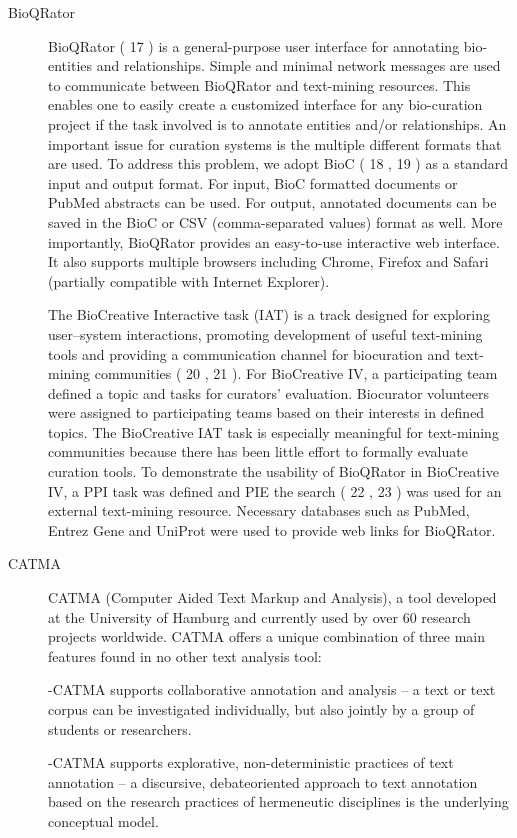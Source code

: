 \begin{description}
    \item[BioQRator]
    BioQRator ( 17 ) is a general-purpose user interface for annotating bio-entities and relationships. Simple and minimal network messages are used to communicate between BioQRator and text-mining resources. This enables one to easily create a customized interface for any bio-curation project if the task involved is to annotate entities and/or relationships. An important issue for curation systems is the multiple different formats that are used. To address this problem, we adopt BioC ( 18 , 19 ) as a standard input and output format. For input, BioC formatted documents or PubMed abstracts can be used. For output, annotated documents can be saved in the BioC or CSV (comma-separated values) format as well. More importantly, BioQRator provides an easy-to-use interactive web interface. It also supports multiple browsers including Chrome, Firefox and Safari (partially compatible with Internet Explorer).

    The BioCreative Interactive task (IAT) is a track designed for exploring user–system interactions, promoting development of useful text-mining tools and providing a communication channel for biocuration and text-mining communities ( 20 , 21 ). For BioCreative IV, a participating team defined a topic and tasks for curators’ evaluation. Biocurator volunteers were assigned to participating teams based on their interests in defined topics. The BioCreative IAT task is especially meaningful for text-mining communities because there has been little effort to formally evaluate curation tools. To demonstrate the usability of BioQRator in BioCreative IV, a PPI task was defined and PIE the search ( 22 , 23 ) was used for an external text-mining resource. Necessary databases such as PubMed, Entrez Gene and UniProt were used to provide web links for BioQRator.

    \item[CATMA]

    CATMA	(Computer	Aided	Text	Markup	and	Analysis),
    a	tool	developed	at	the	University	of	Hamburg	and	currently	used	by	over	60	 research	projects	worldwide.
    CATMA	offers	a	unique	combination	of	three	main	features	found	in	no	other	text	analysis	tool:

    -CATMA supports collaborative annotation and
    analysis – a text or text corpus can	be investigated individually, but also jointly by a group of students or researchers.

    -CATMA supports explorative, non-deterministic
    practices of text annotation – a	 discursive,	 debateoriented	approach	to	text	annotation	based	on	the	research	practices of hermeneutic disciplines is the underlying conceptual model.


\end{description}
